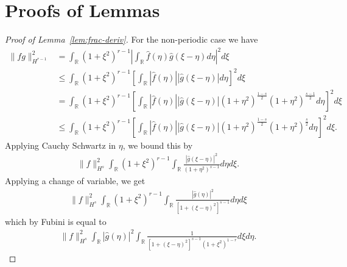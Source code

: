 \documentclass[12pt,reqno]{amsart}
\numberwithin{equation}{section}  %
\numberwithin{figure}{section}
\newcommand{\rr}{\mathbb{R}}
\newcommand{\wh}{\widehat}
\begin{document}
\section{Proofs of Lemmas} 
\label{sec:pf-lemmas}
%
%
%
\begin{proof}[Proof of Lemma~\ref{lem:frac-deriv}]
For the non-periodic case we have
%
%
\begin{equation*}
\begin{split}
  \| fg\|_{H^{r-1}}^{2}
  & = \int_{\rr} (1 + \xi^{2})^{r-1}| \int_{\rr}
  \wh{f}(\eta) \wh{g}( \xi - \eta) d \eta |^{2} d \xi
  \\
  & \le \int_{\rr} (1 + \xi^{2})^{r-1}\left [ \int_{\rr}
  | \wh{f}(\eta) |  | \wh{g}(\xi - \eta) | 
  d \eta \right ]^{2} d \xi
  \\
  & = \int_{\rr}  (1 + \xi^{2})^{r-1}\left [ \int_{\rr}
  | \wh{f}(\eta) |  | \wh{g}(\xi - \eta) | (1 +
  \eta^{2})^{\frac{1-s}{2}} (1 + \eta^{2})^{\frac{s-1}{2}}
  d \eta \right ]^{2} d \xi
  \\
  & \le \int_{\rr}  (1 + \xi^{2})^{r-1}\left [ \int_{\rr} 
  | \wh{f}(\eta) | | \wh{g}(\xi - \eta) | (1 +
  \eta^{2})^{\frac{1-s}{2}} (1 + \eta^{2})^{\frac{s}{2}}
  d \eta \right ]^{2} d \xi.
\end{split}
\end{equation*}
%
Applying Cauchy Schwartz in $\eta$, we bound this by
%
%
%
\begin{equation}
  \label{np-key-term}
\begin{split}
  \| f \|_{H^{s}}^{2} \int_{\rr}  (1 + \xi^{2})^{r-1}\int_{\rr} \frac{|
  \wh{g}(\xi - \eta) |^{2}}{(1 + \eta^{2})^{s-1}} d \eta d \xi.
  \end{split}
\end{equation}
%
%
Applying a change of variable, we get
%
\begin{equation*}
\begin{split}
  \| f \|_{H^{s}}^{2} \int_{\rr} (1 + \xi^{2})^{r-1} \int_{\rr}
\frac{| \wh{g}(\eta) |^{2}}{[1 + (\xi - \eta)^{2}]^{s-1}} d \eta d \xi
  \end{split}
\end{equation*}
which by Fubini is equal to
%
%
\begin{equation}
  \label{int-pre-calc-lem}
\begin{split}
  \|f \|_{H^{s}}^{2} \int_{\rr} | \wh{g}(\eta) |^{2} \int_{\rr} \frac{1}{\left[
  1 + (\xi - \eta)^{2} \right]^{s-1} (1 + \xi^{2})^{1-r}} d \xi d \eta.
\end{split}
\end{equation}

\end{proof}
\end{document}

